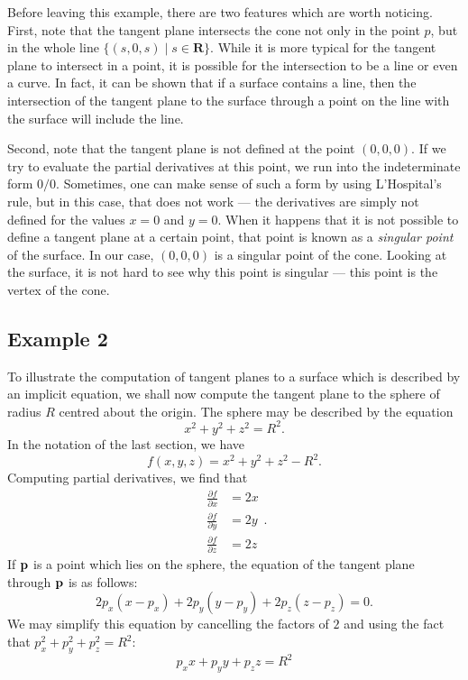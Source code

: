 \documentclass[12pt]{article}
\begin{document}
Before leaving this example, there are two features which are worth noticing.  First, note that the tangent plane intersects the cone not only in the point $p$, but in the whole line $\{(s,0,s) \mid s \in \mathbf{R} \}$.  While it is more typical for the tangent plane to intersect in a point, it is possible for the intersection to be a line or even a curve.  In fact, it can be shown that if a surface contains a line, then the intersection of the tangent plane to the surface through a point on the line with the surface will include the line.

Second, note that the tangent plane is not defined at the point $(0,0,0).$  If we try to evaluate the partial derivatives at this point, we run into the indeterminate form $0/0$.  Sometimes, one can make sense of such a form by using  L'Hospital's rule, but in this case, that does not work --- the derivatives are simply not defined for the values $x = 0$ and $y = 0$.  When it happens that it is not possible to define a tangent plane at a certain point, that point is known as a \emph{singular point} of the surface.  In our case, $(0,0,0)$ is a singular point of the cone.  Looking at the surface, it is not hard to see why this point is singular --- this point is the vertex of the cone.

\subsection{Example 2}

To illustrate the computation of tangent planes to a surface which is described by an implicit equation, we shall now compute the tangent plane to the sphere of radius $R$ centred about the origin.  The sphere may be described by the equation
 $$x^2 + y^2 + z^2 = R^2.$$
In the notation of the last section, we have
 $$f (x, y, z) = x^2 + y^2 + z^2 - R^2.$$
Computing partial derivatives, we find that
 $$\begin{matrix}
\frac {\partial f}{\partial x} &= 2 x \\
\frac {\partial f}{\partial y} &= 2 y \\
\frac {\partial f}{\partial z} &= 2 z
\end{matrix}.$$
If ${\bf p}$ is a point which lies on the sphere, the equation of the tangent plane through ${\bf p}$ is as follows:
 $$2 p_x (x - p_x) + 2 p_y (y - p_y) + 2 p_z (z - p_z) = 0.$$
We may simplify this equation by cancelling the factors of $2$ and using the fact that $p_x^2 + p_y^2 + p_z^2 = R^2$:
 $$p_x x + p_y y + p_z z = R^2$$
\end{document}
